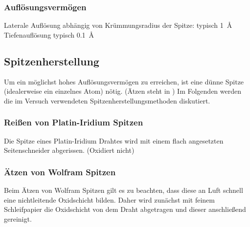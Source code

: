 \documentclass[10pt, a4paper]{article}
\begin{document}
\subsubsection{Auflösungsvermögen}
Laterale Auflösung abhängig von Krümmungsradius der Spitze: typisch \SI{1}{\angstrom}
Tiefenauflösung typisch \SI{0,1}{\angstrom}

\subsection{Spitzenherstellung}
Um ein möglichst hohes Auflösungsvermögen zu erreichen, ist eine dünne Spitze (idealerweise ein einzelnes Atom) nötig. (Ätzen steht in \cite{colton})
Im Folgenden werden die im Versuch verwendeten Spitzenherstellungsmethoden diskutiert.

\subsubsection{Reißen von Platin-Iridium Spitzen}
Die Spitze eines Platin-Iridium Drahtes wird mit einem flach angesetzten Seitenschneider abgerissen. (Oxidiert nicht)

\subsubsection{Ätzen von Wolfram Spitzen}
Beim Ätzen von Wolfram Spitzen gilt es zu beachten, dass diese an Luft schnell eine nichtleitende Oxidschicht bilden.
Daher wird zunächst mit feinem Schleifpapier die Oxidschicht von dem Draht abgetragen und dieser anschließend gereinigt.
\end{document}
